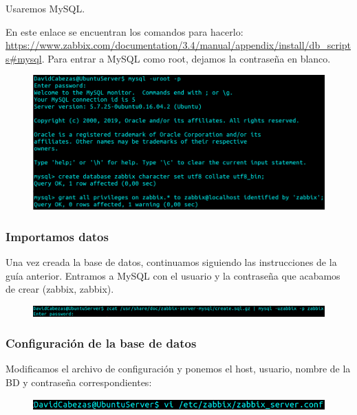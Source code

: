 \documentclass{article}
\begin{document}
Usaremos MySQL.

En este enlace se encuentran los comandos para hacerlo: \url{https://www.zabbix.com/documentation/3.4/manual/appendix/install/db_scripts#mysql}. Para entrar a MySQL como root, dejamos la contraseña en blanco.

\begin{figure}[H]
  \centering
  \includegraphics[width=160mm]{screenshots/server_create-database}
\end{figure}


\subsubsection*{Importamos datos}

Una vez creada la base de datos, continuamos siguiendo las
instrucciones de la guía anterior. Entramos a MySQL con el usuario y la contraseña que acabamos de crear (zabbix, zabbix).

\begin{figure}[H]
  \centering
  \includegraphics[width=160mm]{screenshots/server_importing-data}
\end{figure}

\newpage

\subsubsection*{Configuración de la base de datos}

Modificamos el archivo de configuración y ponemos el host, usuario,
nombre de la BD y contraseña correspondientes:

\begin{figure}[H]
  \centering
  \includegraphics[width=140mm]{screenshots/vi_server_database-conf}
\end{figure}
\end{document}
